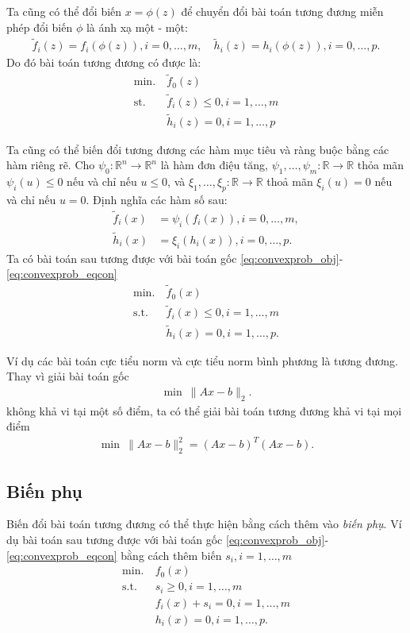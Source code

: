 \documentclass{book}
\begin{document}
Ta cũng có thể đổi biến $x = \phi(z)$ để chuyển đổi bài toán tương đương miễn phép đổi biến $\phi$ là ánh xạ một - một:
\begin{align*}
\tilde{f}_i(z) = f_i(\phi(z)), i = 0, \ldots, m, \quad \tilde{h}_i(z) = h_i(\phi(z)), i = 0, \ldots, p.
\end{align*}
Do đó bài toán tương đương có được là:
\begin{align*}
\mathrm{min.}~ & \tilde{f}_0 (z) \\
\mathrm{st.}~ & \tilde{f}_i (z)  \leq 0, i = 1, \ldots, m \\
			& \tilde{h}_i(z) = 0, i = 1, \ldots, p
\end{align*}

Ta cũng có thể biến đổi tương đương các hàm mục tiêu và ràng buộc bằng các hàm riêng rẽ.
Cho $\psi_0: \mathbb{R}^n \rightarrow \mathbb{R}^n$ là hàm đơn điệu tăng,
$\psi_1, \ldots, \psi_m: \mathbb{R} \rightarrow \mathbb{R}$ thỏa mãn $\psi_i(u) \leq 0$ nếu và chỉ nếu $u \leq 0$, và 
$\xi_1, \ldots, \xi_{p}: \mathbb{R} \rightarrow \mathbb{R}$ thoả mãn $\xi_i(u) = 0$ nếu và chỉ nếu $u = 0$.
Định nghĩa các hàm số sau:
\begin{align*}
\tilde{f}_i(x) &= \psi_i(f_i(x)), i = 0, \ldots, m, \\
\tilde{h}_i(x) &= \xi_{i}(h_i(x)), i = 0, \ldots, p.
\end{align*}
Ta có bài toán sau tương được với bài toán gốc \eqref{eq:convexprob_obj}-\eqref{eq:convexprob_eqcon}
\begin{align*}
\mathrm{min.}~ & \tilde{f}_0 (x) \\
\mathrm{s.t.}~ & \tilde{f}_i (x)  \leq 0, i = 1, \ldots, m \\
			& \tilde{h}_i(x) = 0, i = 1, \ldots, p.
\end{align*}

Ví dụ các bài toán cực tiểu norm và cực tiểu norm bình phương là tương đương.
Thay vì giải bài toán gốc
\begin{align*}
\min ~ \| Ax - b \|_2.
\end{align*}
không khả vi tại một số điểm, ta có thể giải bài toán tương đương khả vi tại mọi điểm
\begin{align*}
\min ~ \| Ax - b \|_2^2 = (Ax - b)^T(Ax - b).
\end{align*}

\subsection*{Biến phụ}
Biến đổi bài toán tương đương có thể thực hiện bằng cách thêm vào \textit{biến phụ}.
Ví dụ bài toán sau tương được với bài toán gốc \eqref{eq:convexprob_obj}-\eqref{eq:convexprob_eqcon} bằng cách thêm biến $s_i, i = 1, \ldots, m$
\begin{align*}
\mathrm{min.}~ & f_0(x)\\
\mathrm{s.t.}~ & s_i \geq 0, i = 1, \ldots, m \\
			& f_i(x) + s_i = 0, i = 1, \ldots, m \\
			& h_i(x) = 0, i = 1, \ldots, p.
\end{align*}
\end{document}
